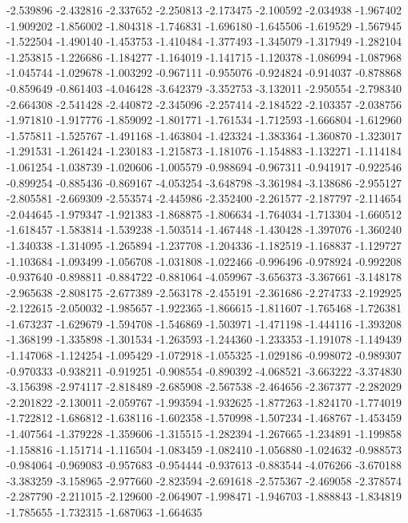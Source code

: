 -2.539896
-2.432816
-2.337652
-2.250813
-2.173475
-2.100592
-2.034938
-1.967402
-1.909202
-1.856002
-1.804318
-1.746831
-1.696180
-1.645506
-1.619529
-1.567945
-1.522504
-1.490140
-1.453753
-1.410484
-1.377493
-1.345079
-1.317949
-1.282104
-1.253815
-1.226686
-1.184277
-1.164019
-1.141715
-1.120378
-1.086994
-1.087968
-1.045744
-1.029678
-1.003292
-0.967111
-0.955076
-0.924824
-0.914037
-0.878868
-0.859649
-0.861403
-4.046428
-3.642379
-3.352753
-3.132011
-2.950554
-2.798340
-2.664308
-2.541428
-2.440872
-2.345096
-2.257414
-2.184522
-2.103357
-2.038756
-1.971810
-1.917776
-1.859092
-1.801771
-1.761534
-1.712593
-1.666804
-1.612960
-1.575811
-1.525767
-1.491168
-1.463804
-1.423324
-1.383364
-1.360870
-1.323017
-1.291531
-1.261424
-1.230183
-1.215873
-1.181076
-1.154883
-1.132271
-1.114184
-1.061254
-1.038739
-1.020606
-1.005579
-0.988694
-0.967311
-0.941917
-0.922546
-0.899254
-0.885436
-0.869167
-4.053254
-3.648798
-3.361984
-3.138686
-2.955127
-2.805581
-2.669309
-2.553574
-2.445986
-2.352400
-2.261577
-2.187797
-2.114654
-2.044645
-1.979347
-1.921383
-1.868875
-1.806634
-1.764034
-1.713304
-1.660512
-1.618457
-1.583814
-1.539238
-1.503514
-1.467448
-1.430428
-1.397076
-1.360240
-1.340338
-1.314095
-1.265894
-1.237708
-1.204336
-1.182519
-1.168837
-1.129727
-1.103684
-1.093499
-1.056708
-1.031808
-1.022466
-0.996496
-0.978924
-0.992208
-0.937640
-0.898811
-0.884722
-0.881064
-4.059967
-3.656373
-3.367661
-3.148178
-2.965638
-2.808175
-2.677389
-2.563178
-2.455191
-2.361686
-2.274733
-2.192925
-2.122615
-2.050032
-1.985657
-1.922365
-1.866615
-1.811607
-1.765468
-1.726381
-1.673237
-1.629679
-1.594708
-1.546869
-1.503971
-1.471198
-1.444116
-1.393208
-1.368199
-1.335898
-1.301534
-1.263593
-1.244360
-1.233353
-1.191078
-1.149439
-1.147068
-1.124254
-1.095429
-1.072918
-1.055325
-1.029186
-0.998072
-0.989307
-0.970333
-0.938211
-0.919251
-0.908554
-0.890392
-4.068521
-3.663222
-3.374830
-3.156398
-2.974117
-2.818489
-2.685908
-2.567538
-2.464656
-2.367377
-2.282029
-2.201822
-2.130011
-2.059767
-1.993594
-1.932625
-1.877263
-1.824170
-1.774019
-1.722812
-1.686812
-1.638116
-1.602358
-1.570998
-1.507234
-1.468767
-1.453459
-1.407564
-1.379228
-1.359606
-1.315515
-1.282394
-1.267665
-1.234891
-1.199858
-1.158816
-1.151714
-1.116504
-1.083459
-1.082410
-1.056880
-1.024632
-0.988573
-0.984064
-0.969083
-0.957683
-0.954444
-0.937613
-0.883544
-4.076266
-3.670188
-3.383259
-3.158965
-2.977660
-2.823594
-2.691618
-2.575367
-2.469058
-2.378574
-2.287790
-2.211015
-2.129600
-2.064907
-1.998471
-1.946703
-1.888843
-1.834819
-1.785655
-1.732315
-1.687063
-1.664635
